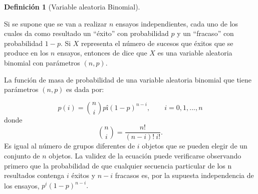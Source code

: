 \documentclass[
  us-letterpaper,
]{scrreprt}
\theoremstyle{plain}
\theoremstyle{plain}
\theoremstyle{definition}
\newtheorem{definition}{Definición}[chapter]
\theoremstyle{remark}
\begin{document}
\begin{definition}[Variable aleatoria
Binomial]\protect\hypertarget{def-var_ale_bino}{}\label{def-var_ale_bino}

Si se supone que se van a realizar \(n\) ensayos independientes, cada
uno de los cuales da como resultado un ``éxito'' con probabilidad \(p\)
y un ``fracaso'' con probabilidad \(1 − p\). Si \(X\) representa el
número de sucesos que éxitos que se produce en los \(n\) ensayos,
entonces de dice que \(X\) es una variable aleatoria binomial con
parámetros \((n,p)\).

La función de masa de probabilidad de una variable aleatoria binomial
que tiene parámetros \((n,p)\) es dada por:

\[
p(i) = \binom{n}{i}pî(1-p)^{n-i}, \qquad i=0, 1, ..., n
\] donde \[\binom{n}{i} = \frac{n!}{(n-i)! \ i!}.\] Es igual al número
de grupos diferentes de \(i\) objetos que se pueden elegir de un
conjunto de \(n\) objetos. La validez de la ecuación puede verificarse
observando primero que la probabilidad de que cualquier secuencia
particular de los n resultados contenga \(i\) éxitos y \(n − i\)
fracasos es, por la supuesta independencia de los ensayos,
\(p^i(1-p)^{n-i}.\)

\end{definition}
\end{document}
